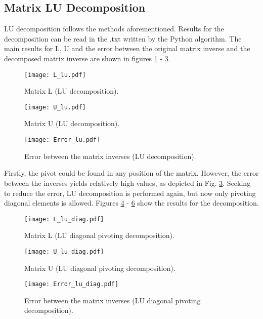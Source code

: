 \subsection{Matrix LU Decomposition} \label{sec:lu}
LU decomposition follows the methods aforementioned. Results for the decomposition can be read in the .txt written by the Python algorithm. The main results for L, U and the error between the original matrix inverse and the decomposed matrix inverse are shown in figures \ref{fig:lu_L} - \ref{fig:lu_inverse_error}. 
\begin{figure}[H]
    \centering
    \texttt{[image: L\_lu.pdf]}
    \caption{Matrix L (LU decomposition).}
    \label{fig:lu_L}
\end{figure}
\begin{figure}[H]
    \centering
    \texttt{[image: U\_lu.pdf]}
    \caption{Matrix U (LU decomposition).}
    \label{fig:lu_inverse_error}
\end{figure}
\begin{figure}[H]
    \centering
    \texttt{[image: Error\_lu.pdf]}
    \caption{Error between the matrix inverses (LU decomposition).}
    \label{fig:lu_inverse_error}
\end{figure}

Firstly, the pivot could be found in any position of the matrix. However, the error between the inverses yields relatively high values, as depicted in Fig. \ref{fig:lu_inverse_error}. Seeking to reduce the error, LU decomposition is performed again, but now only pivoting diagonal elements is allowed. Figures \ref{fig:lu_L_diag} - \ref{fig:lu_inverse_error_diag} show the results for the decomposition.
\begin{figure}[H]
    \centering
    \texttt{[image: L\_lu\_diag.pdf]}
    \caption{Matrix L (LU diagonal pivoting decomposition).}
    \label{fig:lu_L_diag}
\end{figure}
\begin{figure}[H]
    \centering
    \texttt{[image: U\_lu\_diag.pdf]}
    \caption{Matrix U (LU diagonal pivoting decomposition).}
    \label{fig:lu_inverse_error_diag}
\end{figure}
\begin{figure}[H]
    \centering
    \texttt{[image: Error\_lu\_diag.pdf]}
    \caption{Error between the matrix inverses (LU diagonal pivoting decomposition).}
    \label{fig:lu_inverse_error_diag}
\end{figure}

